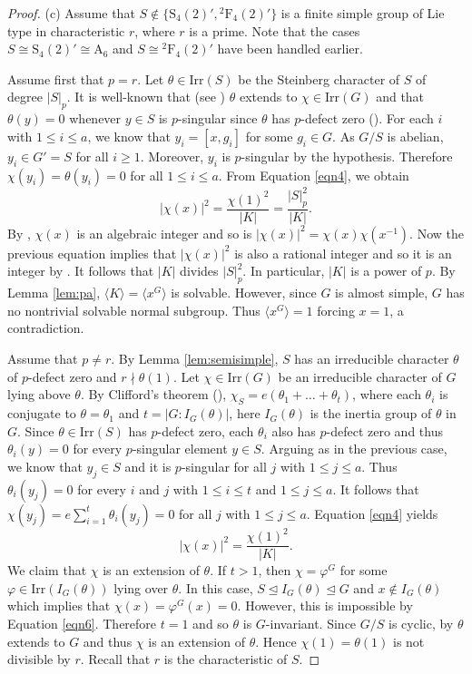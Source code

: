 \documentclass[10pt,a4paper]{amsart}
\newcommand{\AAA}{\mathrm {A}}
\newcommand{\Irr}{\mathrm {Irr}}
\newcommand{\PSp}{\mathrm {S}}
\newcommand{\la}{\langle}
\renewcommand{\leq}{\leqs}
\newcommand{\leqs}{\leqslant}
\newcommand{\ra}{\rangle}
\begin{document}
\begin{proof}
(c) Assume that $S\not\in\{\PSp_4(2)', {}^2\textrm{F}_4(2)'\}$ is a finite simple group of Lie type in characteristic $r$, where $r$ is a prime.  Note that the cases $S\cong \PSp_4(2)'\cong \AAA_6$  and $S\cong {}^2\textrm{F}_4(2)'$ have been handled earlier. 

Assume first that $p=r$. Let $\theta\in\Irr(S)$ be the Steinberg character of $S$ of degree $|S|_p$. It is well-known that (see \cite{F1}) $\theta$ extends to $\chi\in\Irr(G)$ and that $\theta(y)=0$ whenever $y\in S$ is $p$-singular since $\theta$ has $p$-defect zero (\cite[Theorem 8.17]{Isaacs-ct}). For each $i$ with $1\leq i\leq a$, we know that $y_i=[x,g_i]$ for some $g_i\in G$. As $G/S$ is abelian,  $y_i\in G'=S$ for all $i\ge 1$. Moreover, $y_i$ is $p$-singular by the hypothesis. Therefore $\chi(y_i)=\theta(y_i)=0$ for all $1\leq i\leq a$. From Equation \eqref{eqn4}, we obtain 
\begin{equation}\label{eqn5}
|\chi(x)|^2=\frac{\chi(1)^2}{|K|}=\frac{|S|_p^2}{|K|}.
\end{equation}
By \cite[Corollary 3.6]{Isaacs-ct}, $\chi(x)$ is an algebraic integer and so is $|\chi(x)|^2=\chi(x)\chi(x^{-1})$. Now the previous equation implies that $|\chi(x)|^2$ is also a rational integer and so it is an integer by \cite[Lemma 3.2]{Isaacs-ct}. It follows that $|K|$ divides $|S|_p^2$. In particular, $|K|$ is a power of $p$. By Lemma \ref{lem:pa}, $\la K\ra=\la x^G\ra$ is solvable. However, since $G$ is almost simple, $G$ has no nontrivial solvable normal subgroup. Thus $\la x^G\ra=1$ forcing $x=1$, a contradiction.


Assume that $p\neq r.$ By Lemma \ref{lem:semisimple}, $S$ has an irreducible character $\theta$ of $p$-defect zero and $r\nmid \theta(1)$.  Let $\chi\in\Irr(G)$ be an irreducible character of $G$ lying above $\theta$. By Clifford's theorem (\cite[Theorem 6.2]{Isaacs-ct}), $\chi_S=e(\theta_1+\dots+\theta_t)$, where each $\theta_i$ is conjugate to $\theta=\theta_1$ and $t=|G:I_G(\theta)|$, here $I_G(\theta)$ is the inertia group of $\theta$ in $G$.  Since $\theta\in\Irr(S)$ has $p$-defect zero, each $\theta_i$ also has $p$-defect zero and thus $\theta_i(y)=0$ for every $p$-singular element $y\in S.$ Arguing as in the previous case, we know that $y_j\in S$ and it is $p$-singular  for all $j$ with $1\leq j\leq a$. Thus $\theta_i(y_j)=0$ for every $i$ and $j$ with $1\leq i\leq t$ and $1\leq j\leq a.$ It follows that $\chi(y_j)=e\sum_{i=1}^t\theta_i(y_j)=0$ for all $j$ with $1\leq j\leq a$. Equation \eqref{eqn4} yields
\begin{equation}\label{eqn6}
|\chi(x)|^2=\frac{\chi(1)^2}{|K|}.
\end{equation}
We claim that $\chi$ is an extension of $\theta$.  If $t>1$, then $\chi=\varphi^G$ for some $\varphi\in\Irr(I_G(\theta))$ lying over $\theta$. In this case, $S\unlhd I_G(\theta)\unlhd G$ and $x\not\in I_G(\theta)$ which implies that $\chi(x)=\varphi^G(x)=0$. However, this is impossible by Equation \eqref{eqn6}. Therefore $t=1$ and so $\theta$ is $G$-invariant. Since $G/S$ is cyclic, by \cite[Corollary 11.22]{Isaacs-ct} $\theta$ extends to $G$ and thus $\chi$ is an extension of $\theta$. Hence $\chi(1)=\theta(1)$ is not divisible by $r$. Recall that $r$ is the characteristic of $S$.


\end{proof}
\end{document}
